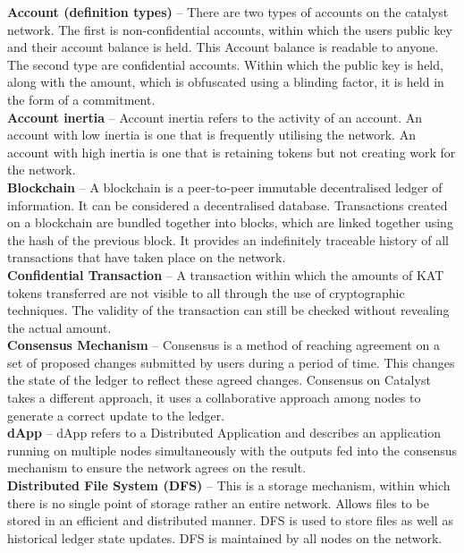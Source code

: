 \textbf{Account (definition types)} – There are two types of accounts on the catalyst network. The first is non-confidential accounts, within which the users public key and their account balance is held. This Account balance is readable to anyone. The second type are confidential accounts. Within which the public key is held, along with the amount, which is obfuscated using a blinding factor, it is held in the form of a commitment. \\
		
\textbf{Account inertia} – Account inertia refers to the activity of an account. An account with low inertia is one that is frequently utilising the network. An account with high inertia is one that is retaining tokens but not creating work for the network. \\

\textbf{Blockchain} – A blockchain is a peer-to-peer immutable decentralised ledger of information. It can be considered a decentralised database. Transactions created on a blockchain are bundled together into blocks, which are linked together using the hash of the previous block. It provides an indefinitely traceable history of all transactions that have taken place on the network.\\

\textbf{Confidential Transaction} – A transaction within which the amounts of KAT tokens transferred are not visible to all through the use of cryptographic techniques. The validity of the transaction can still be checked without revealing the actual amount. \\

\textbf{Consensus Mechanism} – Consensus is a method of reaching agreement on a set of proposed changes submitted by users during a period of time. This changes the state of the ledger to reflect these agreed changes. Consensus on Catalyst takes a different approach, it uses a collaborative approach among nodes to generate a correct update to the ledger.\\

\textbf{dApp} – dApp refers to a Distributed Application and describes an application running on multiple nodes simultaneously with the outputs fed into the consensus mechanism to ensure the network agrees on the result.\\

\textbf{Distributed File System (DFS)} – This is a storage mechanism, within which there is no single point of storage rather an entire network. Allows files to be stored in an efficient and distributed manner. DFS is used to store files as well as historical ledger state updates. DFS is maintained by all nodes on the network. \\


